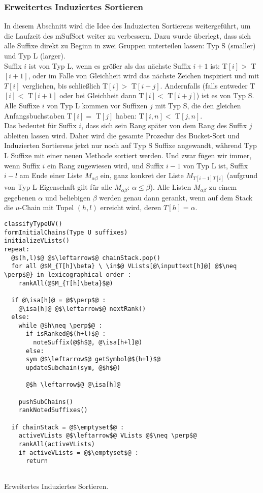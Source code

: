 \subsubsection{Erweitertes Induziertes Sortieren} 
\label{erwIndSort_sec}

In diesem Abschnitt wird die Idee des Induzierten Sortierens weitergeführt, um die Laufzeit des mSufSort weiter zu verbessern.
Dazu wurde überlegt, dass sich alle Suffixe direkt zu Beginn in zwei Gruppen unterteilen lassen: Typ S (smaller) und Typ L (larger).\\
Suffix $i$ ist von Typ L, wenn es größer als das nächste Suffix $i+1$ ist: T$[i] >$ T$[i+1]$, oder im Falle von Gleichheit wird das nächste Zeichen inspiziert und mit $T[i]$ verglichen, bis schließlich T$[i] >$ T$[i+j]$. Andernfalls (falls entweder T$[i] <$ T$[i+1]$ oder bei Gleichheit dann T$[i] <$ T$[i+j]$) ist es von Typ S. Alle Suffixe $i$ von Typ L kommen vor Suffixen $j$ mit Typ S, die den gleichen Anfangsbuchstaben T$[i] =$ T$[j]$ haben: T$[i,n] <$ T$[j,n]$.
\\
Das bedeutet für Suffix $i$, dass sich sein Rang später von dem Rang des Suffix $j$ ableiten lassen wird. Daher wird die gesamte Prozedur des Bucket-Sort und Induzierten Sortierens jetzt nur noch auf Typ S Suffixe angewandt, während Typ L Suffixe mit einer neuen Methode sortiert werden.
Und zwar fügen wir immer, wenn Suffix $i$ ein Rang zugewiesen wird, und Suffix $i-1$ von Typ L ist, Suffix $i-l$ am Ende einer Liste $M_{\alpha\beta}$ ein, ganz konkret der  Liste $M_{T[i-1]T[i]}$ (aufgrund von Typ L-Eigenschaft gilt für alle $M_{\alpha\beta}$: $\alpha \leq \beta$). 
Alle Listen $M_{\alpha\beta}$ zu einem gegebenen $\alpha$ und beliebigen $\beta$ werden genau dann gerankt, wenn auf dem Stack die $u$-Chain mit Tupel $(h, l)$ erreicht wird, deren $T[h] = \alpha$.


\begin{listing}[htp]
\begin{verbatim}
classifyTypeUV()
formInitialChains(Type U suffixes)
initializeVLists()
repeat:
  @$(h,l)$@ @$\leftarrow$@ chainStack.pop()	
  for all @$M_{T[h]\beta} \ \in$@ VLists[@\inputtext[h]@] @$\neq \perp$@} in lexicographical order :
    rankAll(@$M_{T[h]\beta}$@)
  
  if @\isa[h]@ = @$\perp$@ :
    @\isa[h]@ @$\leftarrow$@ nextRank()		
  else:
    while @$h\neq \perp$@ :
      if isRanked@$(h+l)$@ :
        noteSuffix(@$h$@, @\isa[h+l]@)
      else:
      sym @$\leftarrow$@ getSymbol@$(h+l)$@
      updateSubchain(sym, @$h$@)
      
      @$h \leftarrow$@ @\isa[h]@
	
    pushSubChains()	
    rankNotedSuffixes()
  
  if chainStack = @$\emptyset$@ :
    activeVLists @$\leftarrow$@ VLists @$\neq \perp$@
    rankAll(activeVLists)
    if activeVLists = @$\emptyset$@ :
      return
  		
\end{verbatim}
\caption{Erweitertes Induziertes Sortieren.}
\label{erwIndSort}
\end{listing}

